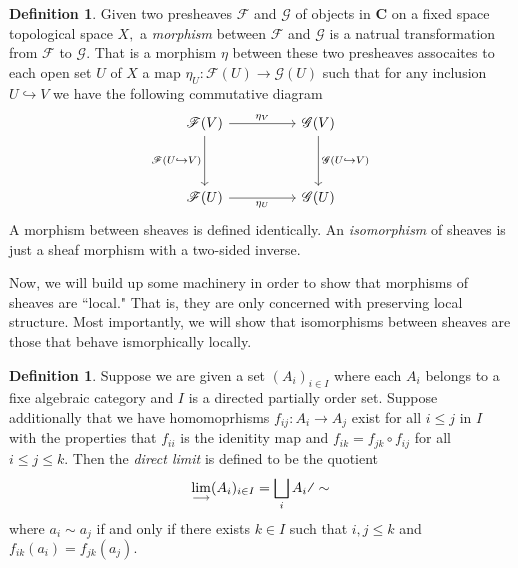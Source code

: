 \documentclass[psamsfonts]{amsart}
\theoremstyle{definition}
\newtheorem{defn}[thm]{Definition}
\theoremstyle{remark}
\numberwithin{equation}{section}
\begin{document}
  \begin{defn}
    Given two presheaves $\mathscr{F}$ and $\mathscr{G}$ of objects in \textbf{C} on a fixed space topological space $X,$ a \textit{morphism} between $\mathscr{F}$ and $\mathscr{G}$ is a natrual transformation from $\mathscr{F}$ to $\mathscr{G}.$ That is a morphism $\eta$ between these two presheaves assocaites to each open set $U$ of $X$ a map $\eta_U: \mathscr{F}(U) \to \mathscr{G}(U)$ such that for any inclusion $U \hookrightarrow V$ we have the following commutative diagram 
    \[\begin{tikzcd}
      {\mathscr{F}(V)} && {\mathscr{G}(V)} \\
      \\
      {\mathscr{F}(U)} && {\mathscr{G}(U)}
      \arrow["{\mathscr{F}(U \hookrightarrow V)}"', from=1-1, to=3-1]
      \arrow["{\eta_V}", from=1-1, to=1-3]
      \arrow["{\mathscr{G}(U \hookrightarrow V)}", from=1-3, to=3-3]
      \arrow["{\eta_U}"', from=3-1, to=3-3]
    \end{tikzcd}\]
    A morphism between sheaves is defined identically. An \textit{isomorphism} of sheaves is just a sheaf morphism with a two-sided inverse. \cite{hartshorne_1977}
  \end{defn}

  Now, we will build up some machinery in order to show that morphisms of sheaves are ``local." That is, they are only concerned with preserving local structure. Most importantly, we will show that isomorphisms between sheaves are those that behave ismorphically locally.

  \begin{defn}
    Suppose we are given a set $(A_i)_{i \in I}$ where each $A_i$ belongs to a fixe algebraic category and $I$ is a directed partially order set. Suppose additionally that we have homomoprhisms $f_{ij}: A_i \to A_j$ exist for all $i \leq j$ in $I$ with the properties that $f_{ii}$ is the idenitity map and $f_{ik} = f_{jk} \circ f_{ij}$ for all $i \leq j \leq k.$ Then the \textit{direct limit} is defined to be the quotient 
    \[
      \lim_{\longrightarrow} (A_i)_{i \in I} = \bigsqcup_i A_i \text{\textfractionsolidus} \sim
    \]
    where $a_i \sim a_j$ if and only if there exists $k \in I$ such that $i,j \leq k$ and $f_{ik}(a_i) = f_{jk}(a_j).$ \cite{direct_limit}
  \end{defn}
\end{document}
